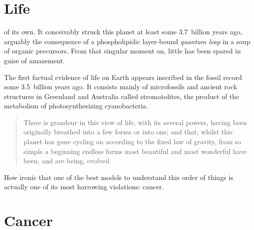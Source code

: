 \documentclass{tufte-book}
\begin{document}
\section{Life}

 of its own.  It conceivably struck this
planet at least some 3.7~billion years ago,\cite{schopf_evidence_2007}
arguably the consequence of a phospholipidic \mbox{layer-bound}
\emph{quantum leap} in a soup of organic
precursors.\cite{miller_organic_1959} From that
singular moment on, little has been spared in guise of
amazement.

The first factual evidence of life on Earth appears inscribed in the
fossil record some 3.5~billion years ago.  It consists mainly of
microfossils and ancient rock structures in Greenland and Australia
called
stromatolites,\cite{ohtomo_evidence_2014,noffke_microbially_2013} the
product of the metabolism of photosynthesizing cyanobacteria.

\begin{quotation}
  There is grandeur in this view of life, with its several powers, having been
  originally breathed into a few forms or into one; and that, whilst this planet
  has gone cycling on according to the fixed law of gravity, from so simple a
  beginning endless forms most beautiful and most wonderful have been, and are
  being, evolved.
\end{quotation}

How ironic that one of the best models to understand this order of things is
actually one of its most harrowing violations: cancer.

\section{Cancer}

\backmatter



% 
% 
\end{document}
